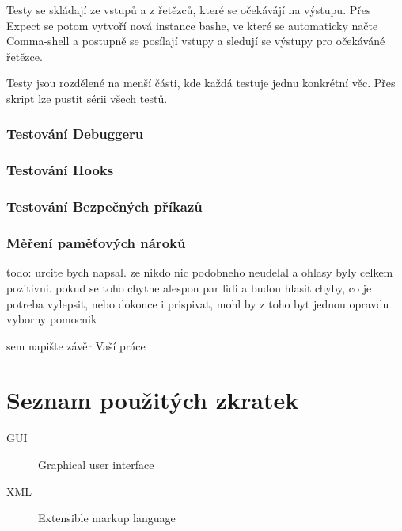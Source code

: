 \documentclass[thesis=M,czech]{FITthesis}[2012/06/26]
\begin{document}
Testy se skládají ze vstupů a z řetězců, které se očekávájí na výstupu. Přes Expect se potom vytvoří nová instance bashe, ve které se automaticky načte Comma-shell a postupně se posílají vstupy a sledují se výstupy pro očekáváné řetězce.

Testy jsou rozdělené na menší části, kde každá testuje jednu konkrétní věc. Přes skript lze pustit sérii všech testů.

\subsection{Testování Debuggeru}

\subsection{Testování Hooks}

\subsection{Testování Bezpečných příkazů}

\subsection{Měření paměťových nároků}

%
%
\begin{conclusion}

	todo: urcite bych napsal. ze nikdo nic podobneho neudelal a ohlasy byly celkem pozitivni. pokud se toho chytne alespon par lidi a budou hlasit chyby, co je potreba vylepsit, nebo dokonce i prispivat, mohl by z toho byt jednou opravdu vyborny pomocnik

	sem napište závěr Vaší práce
\end{conclusion}







\appendix

\chapter{Seznam použitých zkratek}
\begin{description}
	\item[GUI] Graphical user interface
	\item[XML] Extensible markup language
\end{description}
\end{document}
